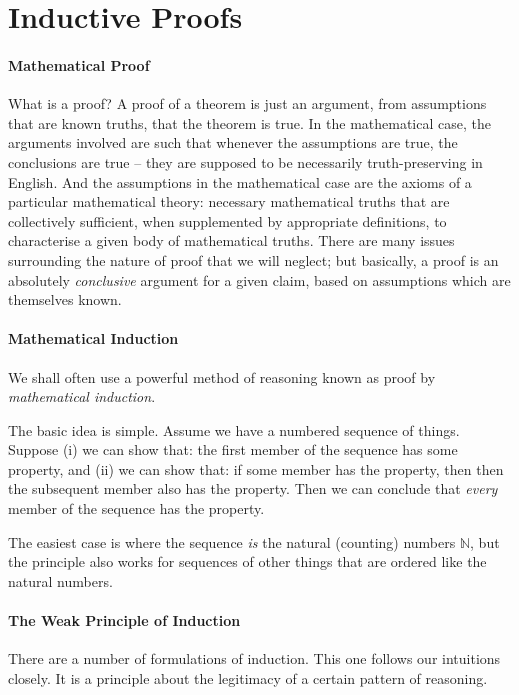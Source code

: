 
\section{Inductive Proofs}

\paragraph{Mathematical Proof} What is a proof? A proof of a theorem is just an argument, from assumptions that are known truths, that the theorem is true. In the mathematical case, the arguments involved are such that whenever the assumptions are true, the conclusions are true – they are supposed to be necessarily truth-preserving in English. And the assumptions in the mathematical case are the axioms of a particular mathematical theory: necessary mathematical truths that are collectively sufficient, when supplemented by appropriate definitions, to characterise a given body of mathematical truths. There are many issues surrounding the nature of proof that we will neglect; but basically, a proof is an absolutely \emph{conclusive} argument for a given claim, based on assumptions which are themselves known.


\paragraph{Mathematical Induction}
 We shall often use a powerful method of reasoning known as proof by \emph{mathematical induction}. 

The basic idea is simple. Assume we have a numbered sequence of things. Suppose (i) we can show that: the first member of the sequence has some property, and (ii) we can show that: if some member has the property, then then the subsequent member also has the property. Then we can conclude that \emph{every} member of the sequence has the property.

The easiest case is where the sequence \emph{is} the natural (counting) numbers $\mathbb{N}$, but the principle also works for sequences of other things that are ordered like the natural numbers.


\paragraph{The Weak Principle of Induction}

There are a number of formulations of induction. This one follows our intuitions closely. It is a principle about the legitimacy of a certain pattern of reasoning.

